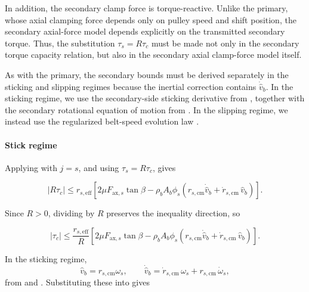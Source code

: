 \documentclass[11pt]{article}
\numberwithin{equation}{section}
\begin{document}
In addition, the secondary clamp force is torque-reactive.
Unlike the primary, whose axial clamping force depends only on pulley speed
and shift position, the secondary axial-force model depends explicitly on the
transmitted secondary torque.
Thus, the substitution \(\tau_s = R\tau_c\) must be made not only in the
secondary torque capacity relation, but also in the secondary axial clamp-force
model itself.

As with the primary, the secondary bounds must be derived separately in the
sticking and slipping regimes because the inertial correction contains
\(\dot{\hat v}_b\).
In the sticking regime, we use the secondary-side sticking derivative from
, together with the secondary rotational
equation of motion from .
In the slipping regime, we instead use the regularized belt-speed evolution
law .

\paragraph{Stick regime}

Applying  with \(j=s\), and using
\(\tau_s = R\tau_c\), gives

\begin{equation}
|R\tau_c|
\le
r_{s,\mathrm{eff}}
\left[
2\mu F_{\mathrm{ax},s}\tan\beta
-
\rho_b A_b \phi_s
\left(
r_{s,\mathrm{cm}}\dot{\hat v}_b
+
\dot r_{s,\mathrm{cm}}\,\hat v_b
\right)
\right].
\label{eq:tau_c_capacity_stick_start_secondary}
\end{equation}

Since \(R>0\), dividing by \(R\) preserves the inequality direction, so

\begin{equation}
|\tau_c|
\le
\frac{r_{s,\mathrm{eff}}}{R}
\left[
2\mu F_{\mathrm{ax},s}\tan\beta
-
\rho_b A_b \phi_s
\left(
r_{s,\mathrm{cm}}\dot{\hat v}_b
+
\dot r_{s,\mathrm{cm}}\,\hat v_b
\right)
\right].
\label{eq:tau_c_capacity_stick_start_secondary_divided}
\end{equation}

In the sticking regime,
\[
\hat v_b = r_{s,\mathrm{cm}}\omega_s,
\qquad
\dot{\hat v}_b
=
\dot r_{s,\mathrm{cm}}\,\omega_s
+
r_{s,\mathrm{cm}}\,\dot\omega_s,
\]
from  and .
Substituting these into
 gives
\end{document}
